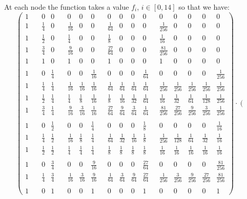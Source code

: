 At each node the function takes a value $f_i$, $i\in[0,14]$ so that we have:
\[
\left(
\begin{array}{lllllllllllllll}
1\quad{} &0 & 0\quad{}& 0  &0&0\quad{} &0 &0&0&0\quad{} &0& 0&0&0&0\\
1 & \frac14&0&\frac{1}{16}&0&0&\frac{1}{64}&0&0&0&\frac{1}{256}&0&0&0&0 \\
1 & \frac12&0&\frac14&0&0&\frac18&0&0&0&\frac{1}{16}&0&0&0&0 \\
1 & \frac34&0&\frac{9}{16}&0&0&\frac{27}{64}&0&0&0&\frac{81}{256}&0&0&0&0 \\ 
1 &1&0&1&0&0&1&0&0&0&1&0&0&0&0 \\ \\
1 &0&\frac14&0&0&\frac{1}{16}&0&0&0&\frac{1}{64}&0&0&0&0&\frac{1}{256} \\
1 &\frac14&\frac14&\frac{1}{16}&\frac{1}{16}&\frac{1}{16}&\frac{1}{64}&\frac{1}{64}&\frac{1}{64}&\frac{1}{64}&\frac{1}{256}&\frac{1}{256}&\frac{1}{256}&\frac{1}{256}&\frac{1}{256} \\
1 &\frac12&\frac14&\frac14&\frac18&\frac{1}{16}&\frac18&\frac{1}{16}&\frac{1}{32}&\frac{1}{64}&\frac{1}{16}&\frac{1}{32}&\frac{1}{64}&\frac{1}{128}&\frac{1}{256} \\
1 &\frac34&\frac14&\frac{9}{16}&\frac{3}{16}&\frac{1}{16}&\frac{27}{64}&\frac{9}{64}&\frac{3}{64}&\frac{1}{64}&\frac{81}{256}&\frac{27}{256}&\frac{9}{256}&\frac{3}{256}&\frac{1}{256} \\
\\
1 &0&\frac12&0&0&\frac14&0&0&0&\frac18&0&0&0&0&\frac{1}{16} \\
1 &\frac14&\frac12&\frac{1}{16}&\frac{1}{8}&\frac{1}{4}&\frac{1}{64}&\frac{1}{32}&\frac{1}{16}&\frac{1}{8}&\frac{1}{256}&\frac{1}{128}&\frac{1}{64}&\frac{1}{32}&\frac{1}{16} \\
1 &\frac12&\frac12&\frac14&\frac14&\frac14&\frac{1}{8}&\frac{1}{8}&\frac{1}{8}&\frac{1}{8}&\frac{1}{16}&\frac{1}{16}&\frac{1}{16}&\frac{1}{16}&\frac{1}{16} \\ \\
1 &0&\frac34&0&0&\frac{9}{16}&0&0&0&\frac{27}{64}&0&0&0&0&\frac{81}{256} \\
1 &\frac14&\frac34&\frac{1}{16}&\frac{3}{16}&\frac{9}{16}&\frac{1}{64}&\frac{3}{64}&\frac{9}{64}&\frac{27}{64}&\frac{1}{256}&\frac{3}{256}&\frac{9}{256}&\frac{27}{256}&\frac{81}{256} \\ \\
1 &0&1&0&0&1&0&0&0&1&0&0&0&0&1 
\end{array}
\right)
\cdot
\left(
\begin{array}{c}

\end{array}\]
